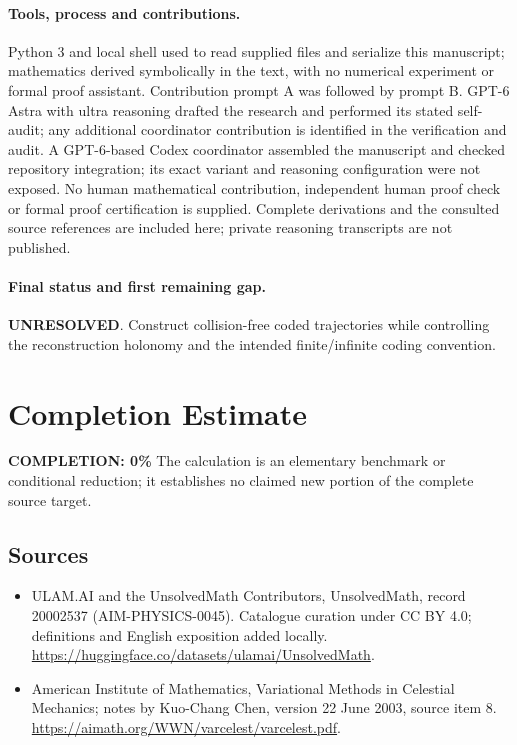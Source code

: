 \documentclass[11pt]{article}
\begin{document}
\paragraph{Tools, process and contributions.}
Python 3 and local shell used to read supplied files and serialize this manuscript; mathematics derived symbolically in the text, with no numerical experiment or formal proof assistant. Contribution prompt A was followed by prompt B. GPT-6 Astra with ultra reasoning drafted the research and performed its stated self-audit; any additional coordinator contribution is identified in the verification and audit. A GPT-6-based Codex coordinator assembled the manuscript and checked repository integration; its exact variant and reasoning configuration were not exposed. No human mathematical contribution, independent human proof check or formal proof certification is supplied. Complete derivations and the consulted source references are included here; private reasoning transcripts are not published.

\paragraph{Final status and first remaining gap.}
\textbf{UNRESOLVED}. Construct collision-free coded trajectories while controlling the reconstruction holonomy and the intended finite/infinite coding convention.

\section{Completion Estimate}
\noindent\textbf{COMPLETION: 0\%}
The calculation is an elementary benchmark or conditional reduction; it establishes no claimed new portion of the complete source target.

\subsection{Sources}
\begin{itemize}
\item[\hypertarget{source:20002537:1}{S1}] ULAM.AI and the UnsolvedMath Contributors, UnsolvedMath, record 20002537 (AIM-PHYSICS-0045). Catalogue curation under CC BY 4.0; definitions and English exposition added locally.
\url{https://huggingface.co/datasets/ulamai/UnsolvedMath}.
\item[\hypertarget{source:20002537:2}{S2}] American Institute of Mathematics, Variational Methods in Celestial Mechanics; notes by Kuo-Chang Chen, version 22 June 2003, source item 8.
\url{https://aimath.org/WWN/varcelest/varcelest.pdf}.
\end{itemize}
\label{end:20002537}
\end{document}
